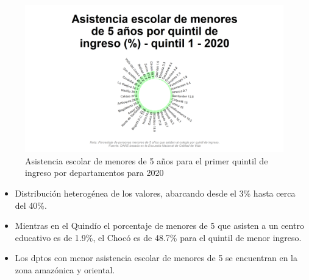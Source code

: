     \begin{figure}[H]
        \caption{Asistencia escolar de menores de 5 años para el primer quintil de ingreso por departamentos para 2020 \label{map_result_2} }
        \begin{center}
        \includegraphics[width=\textwidth,keepaspectratio]{img/var_101_static.png}
        \end{center}
    \end{figure}
            \begin{itemize}
                \item Distribución heterogénea de los valores, abarcando desde el 3\% hasta cerca del 40\%.
                \item Mientras en el Quindío el porcentaje de menores de 5 que asisten a un centro educativo es de 1.9\%, el Chocó es de 48.7\% para el quintil de menor ingreso.
                \item Los dptos con menor asistencia escolar de menores de 5 se encuentran en la zona amazónica y oriental.
                \end{itemize}

